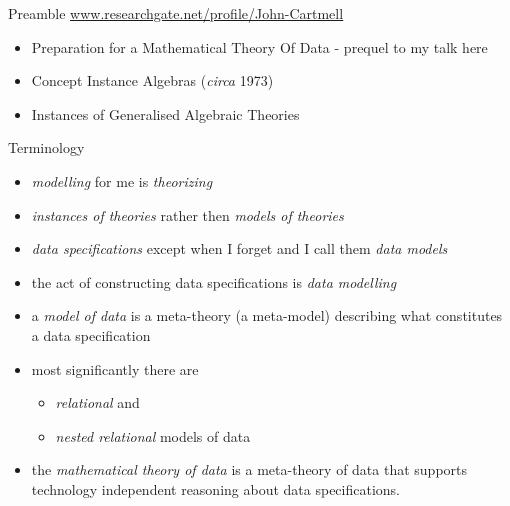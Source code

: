\newtheorem{construction}[theorem]{Construction}



\begin{frame}
\titlepage
{}
\end{frame} 


\begin{frame}{Preamble}
\underline{\url{www.researchgate.net/profile/John-Cartmell}}
\medskip
\begin{itemize}
\item Preparation for a Mathematical Theory Of Data - prequel to my talk here
\pause \item Concept Instance Algebras (\textit{circa} 1973)
\pause \item Instances of Generalised Algebraic Theories 
\end{itemize}
\end{frame}

\begin{frame}{Terminology}
\begin{itemize}
\item \textit{modelling} for me is \textit{theorizing}
\item \textit{instances of theories}  rather then \textit{models of theories}
\item \textit{data specifications} except when I forget and I call them \textit{data models}
\item the act of constructing data specifications is \textit{data modelling}
\item a \textit{model of data} is a meta-theory (a meta-model) describing what constitutes a data specification 
\item most significantly there are
\begin{itemize}
\item \textit{relational} and 
\item \textit{nested relational} 
models of data
\end{itemize}
\item the \textit{mathematical theory of data} is a meta-theory of data that supports technology  independent reasoning about data specifications.
\end{itemize}
\end{frame}


